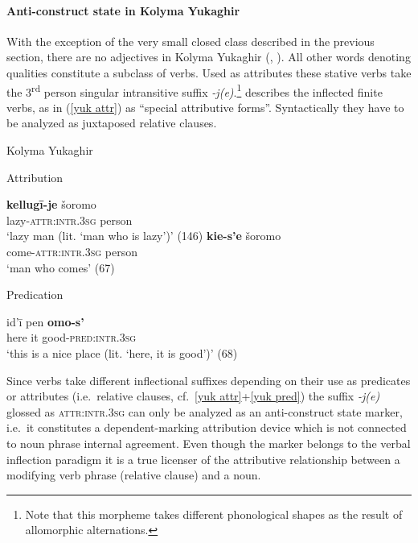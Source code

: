 \paragraph{Anti-construct state in Kolyma Yukaghir}
With the exception of the very small closed class described in the previous section, there are no adjectives in Kolyma Yukaghir (\citealt[79–112]{krejnovic1982}, \citealt[66–69, 145–147]{maslova2003b}). All other words denoting qualities constitute a subclass of verbs. Used as attributes these stative verbs take the 3\textsuperscript{rd} person singular intransitive suffix \mbox{\textit{-j(e)}}.\footnote{Note that this morpheme takes different phonological shapes as the result of allomorphic alternations.} \citet[66, elsewhere]{maslova2003b} describes the inflected finite verbs, as in (\ref{yuk attr}) as “special attributive forms”. Syntactically they have to be analyzed as juxtaposed relative clauses.
\begin{exe}
\ex 	
\rm{Kolyma Yukaghir \citep{maslova2003b}}
\begin{xlist}
\ex 
\label{yuk attr}
\rm{Attribution}
\begin{xlist}
\ex
\gll 	\textbf{kellugī-je} šoromo\\
	lazy-\textsc{attr:intr.3sg} person\\
\glt	‘lazy man (lit. ‘man who is lazy’)’ (146)
\ex
\gll	\textbf{kie-s'e} šoromo\\
	come-\textsc{attr:intr.3sg} person\\
\glt	‘man who comes’ (67)
\end{xlist}

\ex 
\label{yuk pred} 
\rm{Predication}
\begin{xlist}
\ex
\gll 	id'ī pen \textbf{omo-s'}\\
	here it good-\textsc{pred:intr.3sg}\\
\glt	‘this is a nice place (lit. ‘here, it is good’)’ (68)
\end{xlist}
\end{xlist}
\end{exe}
Since verbs take different inflectional suffixes depending on their use as predicates or attributes (i.e.~relative clauses, cf.~\ref{yuk attr}+\ref{yuk pred}) the suffix \textit{-j(e)} glossed as \textsc{attr:intr.3sg} can only be analyzed as an anti-construct state marker, i.e.~it constitutes a dependent-marking attribution device which is not connected to noun phrase internal agreement. Even though the marker belongs to the verbal inflection paradigm it is a true licenser of the attributive relationship between a modifying verb phrase (relative clause) and a noun.

